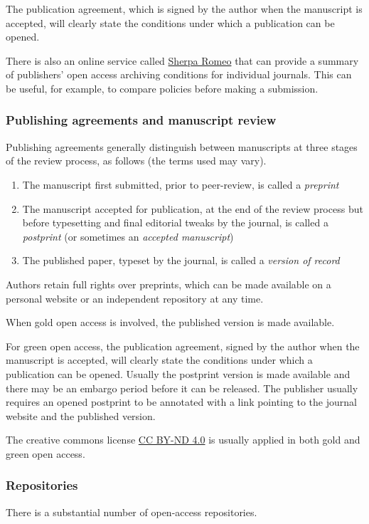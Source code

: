 {The publication agreement, which is signed by the author when the manuscript is accepted, will clearly state the conditions under which a publication can be opened. 

There is also an online service called \href{https://sherpa.ac.uk/romeo/}{Sherpa Romeo} that can provide a summary of publishers' open access archiving conditions for individual journals. This can be useful, for example, to compare policies before making a submission. 

\subsubsection{Publishing agreements and manuscript review}
\label{sss:pub_agreements}
Publishing agreements generally distinguish between manuscripts at three stages of the review process, as follows (the terms used may vary).
\begin{enumerate}
\item The manuscript first submitted, prior to peer-review, is called a \textit{preprint}
\item The manuscript accepted for publication, at the end of the review process but before typesetting and final editorial tweaks by the journal, is called a \textit{postprint} (or sometimes an \textit{accepted manuscript})
\item The published paper, typeset by the journal, is called a \textit{version of record}
\end{enumerate}

Authors retain full rights over preprints, which can be made available on a personal website or an independent repository at any time. 

When gold open access is involved, the published version is made available. 

For green open access, the publication agreement, signed by the author when the manuscript is accepted, will clearly state the conditions under which a publication can be opened. Usually the postprint version is made available and there may be an embargo period before it can be released. The publisher usually requires an opened postprint to be annotated with a link pointing to the journal website and the published version. 

The creative commons license \href{https://creativecommons.org/licenses/by-nd/4.0/}{CC BY-ND 4.0} is usually applied in both gold and green open access. 

\subsubsection{Repositories}
\label{sss:repositories}
There is a substantial number of open-access repositories. 

}
